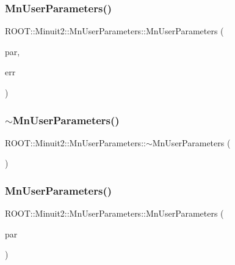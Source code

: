 \subsubsection{\texorpdfstring{MnUserParameters()}{MnUserParameters()}\hspace{0.1cm}{\footnotesize\ttfamily [2/9]}}
{\footnotesize\ttfamily R\+O\+O\+T\+::\+Minuit2\+::\+Mn\+User\+Parameters\+::\+Mn\+User\+Parameters (\begin{DoxyParamCaption}\item[{const std\+::vector$<$ double $>$ \&}]{par,  }\item[{const std\+::vector$<$ double $>$ \&}]{err }\end{DoxyParamCaption})}

\mbox{\label{classROOT_1_1Minuit2_1_1MnUserParameters_a3b2d1f74827108c7dc34a5eb879dcc24}} 
\subsubsection{\texorpdfstring{$\sim$MnUserParameters()}{~MnUserParameters()}\hspace{0.1cm}{\footnotesize\ttfamily [1/3]}}
{\footnotesize\ttfamily R\+O\+O\+T\+::\+Minuit2\+::\+Mn\+User\+Parameters\+::$\sim$\+Mn\+User\+Parameters (\begin{DoxyParamCaption}{ }\end{DoxyParamCaption})\hspace{0.3cm}{\ttfamily [inline]}}

\mbox{\label{classROOT_1_1Minuit2_1_1MnUserParameters_aa4ba65a64a5dd051fecc3366c8e10617}} 
\subsubsection{\texorpdfstring{MnUserParameters()}{MnUserParameters()}\hspace{0.1cm}{\footnotesize\ttfamily [3/9]}}
{\footnotesize\ttfamily R\+O\+O\+T\+::\+Minuit2\+::\+Mn\+User\+Parameters\+::\+Mn\+User\+Parameters (\begin{DoxyParamCaption}\item[{const \mbox{\hyperlink{classROOT_1_1Minuit2_1_1MnUserParameters}{Mn\+User\+Parameters}} \&}]{par }\end{DoxyParamCaption})\hspace{0.3cm}{\ttfamily [inline]}}

